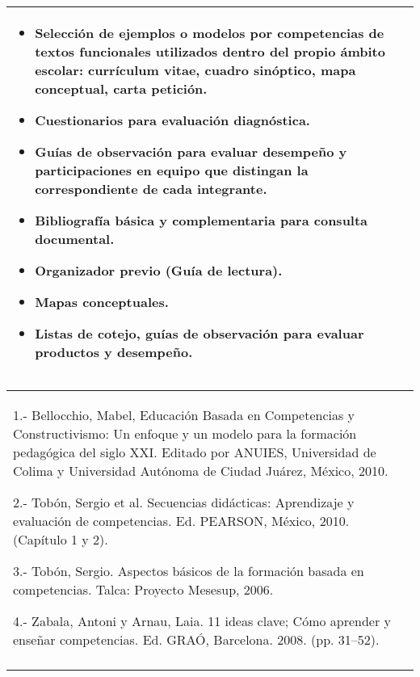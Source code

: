 \begin{tiny}
\begin{center}
\begin{supertabular}{|p{0.85\textwidth}|}
\begin{itemize}
\item Selección de ejemplos o modelos por competencias de textos funcionales
utilizados dentro del propio ámbito escolar: currículum vitae, cuadro
sinóptico, mapa conceptual, carta petición.
\item Cuestionarios para evaluación diagnóstica.
\item Guías de observación para evaluar desempeño y participaciones en equipo
que distingan la correspondiente de cada integrante.
\item Bibliografía básica y complementaria para consulta documental.
\item Organizador previo (Guía de lectura).
\item Mapas conceptuales.
\item Listas de cotejo, guías de observación para evaluar productos y desempeño.
\end{itemize}
\\\hline
\end{supertabular}
\end{center}

\bigskip
\begin{center}
\setlength{\extrarowheight}{2.5pt}
\begin{supertabular}{|p{0.85\textwidth}|}
\hline
{}\centering{}\\\hline

1.- Bellocchio, Mabel, Educación Basada en Competencias y Constructivismo: Un
enfoque y un modelo para la formación pedagógica del siglo XXI\@. Editado por
ANUIES, Universidad de Colima y Universidad Autónoma de Ciudad Juárez, México, 2010.

2.- Tobón, Sergio et al\@. Secuencias didácticas: Aprendizaje y evaluación de competencias. Ed\@. PEARSON, México, 2010. (Capítulo 1 y 2). 

3.- Tobón, Sergio. Aspectos básicos de la formación basada en competencias. Talca: Proyecto Mesesup, 2006.  

4.- Zabala, Antoni y Arnau, Laia. 11 ideas clave; Cómo aprender y enseñar competencias. Ed\@. GRAÓ, Barcelona. 2008. (pp. 31--52). \\\hline

\centering{}\\\hline


\end{supertabular}
\end{center}
\end{tiny}

